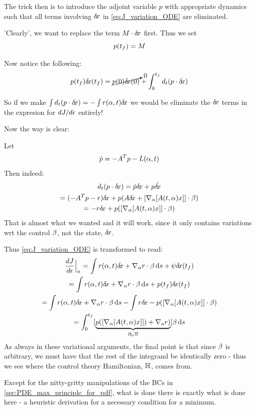 \documentclass{article}
\begin{document}
The trick then is to introduce the adjoint variable $p$ with appropriate
dynamics such that all terms involving ${ \delta\! x}$ in \cref{eq:J_variation_ODE} are
eliminated.

'Clearly', we want to replace the term $ M \cdot { \delta\! x} $ first. Thus we set 
$$
p({ t_f }) = M
$$

Now notice the following:
$$p({ t_f }){ \delta\! x}({ t_f }) = \cancelto{0}{p(0){ \delta\! x}(0)} + \int_0^{ t_f } d_t (p \cdot { \delta\! x})$$

So if we make $\int d_t (p \cdot { \delta\! x}) = - \int r({\alpha},t) { \delta\! x}$ we would be
eliminate the ${ \delta\! x}$ terms in the expresion for $dJ/d{\epsilon}$ entirely!

Now the way is clear:

Let 
$$ 
\dot{p} = -A^T p - L({\alpha},t)
$$
Then indeed:
\begin{multline}
d_t (p \cdot { \delta\! x}) = \dot{p} { \delta\! x} + p \dot{{ \delta\! x}}
\\
= (-A^T p - r){ \delta\! x} + p (A{ \delta\! x}+ [{ \nabla }_{\alpha} [ A(t,{\alpha})x]] \cdot{\beta})
\\
= -r{ \delta\! x} + p ([{ \nabla }_{\alpha} [ A(t,{\alpha})x]] \cdot{\beta})
\end{multline}
That is almost what we wanted and it will work, since it only contains
variations wrt the control ${\beta}$, not the state, ${ \delta\! x}$. 

Thus
\cref{eq:J_variation_ODE} is transformed to read:
\begin{multline}
\frac {dJ}{d{\epsilon}} \Big|_{{\alpha}} = 
\int r({\alpha},t) { \delta\! x} +  { \nabla }_{\alpha} r \cdot {\beta} \, \mathrm{d} s + \psi { \delta\! x}({ t_f })
\\
=
\int r({\alpha},t) { \delta\! x} +  { \nabla }_{\alpha} r \cdot {\beta} \, \mathrm{d} s + p({ t_f }) { \delta\! x}({ t_f })
\\
= \int r({\alpha},t) { \delta\! x} +  { \nabla }_{\alpha} r \cdot {\beta} \, \mathrm{d} s - \int r { \delta\! x} - p ([{ \nabla }_{\alpha} [
A(t,{\alpha})x]] \cdot{\beta})
\\
=
\int_0^{ t_f }  
[\underbrace{p ([{ \nabla }_{\alpha} [A(t,{\alpha})x]] ) + { \nabla }_a r)}_{{\partial}_{\alpha} { \mathbb{H}}} ] 
{\beta} \, \mathrm{d} s
\end{multline}
As always in these variational arguments, the final point is that since ${\beta}$ is
arbitrary, we must have that the rest of the integrand be identically zero -
thus we see where the control theory Hamiltonian, ${ \mathbb{H}}$, comes from.
 
Except for the nitty-gritty manipulations of the BCs in
\cref{sec:PDE_max_principle_for_pdf}, what is done there is exactly what is done
here - a heuristic derivation for a necessary condition for a minimum.





\end{document}
